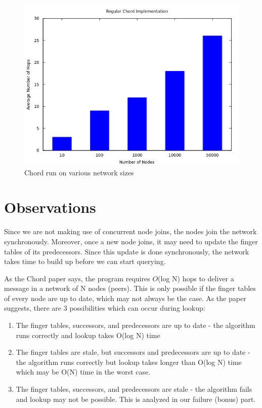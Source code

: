\documentclass[11pt]{article}
\begin{document}
\begin{figure}[h]
    \includegraphics[scale=0.75]{images/regularchord.png}
    \caption{Chord run on various network sizes}
    \label{chordresults}
\end{figure}


\section{Observations}
Since we are not making use of concurrent node joins, the nodes join the network synchronously. Moreover, once a new node joins, it may need to update the finger tables of its predecessors. Since this update is done synchronously, the network takes time to build up before we can start querying.

As the Chord paper says, the program requires $O$(log N) hops to deliver a message in a network of N nodes (peers). This is only possible if the finger tables of every node are up to date, which may not always be the case. As the paper suggests, there are 3 possibilities which can occur during lookup:
\begin{enumerate}
\item The finger tables, successors, and predecessors are up to date - the algorithm runs correctly and lookup takes O(log N) time
\item The finger tables are stale, but successors and predecessors are up to date - the algorithm runs correctly but lookup takes longer than O(log N) time which may be O(N) time in the worst case.
\item The finger tables, successors, and predecessors are stale - the algorithm fails and lookup may not be possible. This is analyzed in our failure (bonus) part.
\end{enumerate}
\end{document}
